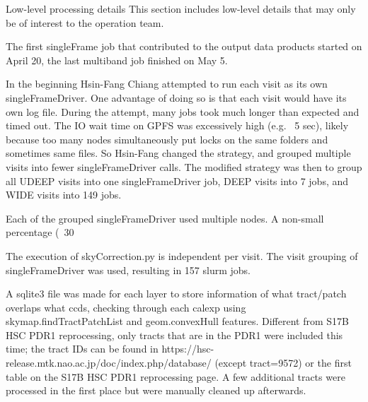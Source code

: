 Low-level processing details
This section includes low-level details that may only be of interest to the operation team.

The first singleFrame job that contributed to the output data products started on April 20, the last multiband job finished on May 5. 

In the beginning Hsin-Fang Chiang attempted to run each visit as its own singleFrameDriver. One advantage of doing so is that each visit would have its own log file. During the attempt, many jobs took much longer than expected and timed out. The IO wait time on GPFS was excessively high (e.g. ~5 sec), likely because too many nodes simultaneously put locks on the same folders and sometimes same files. So Hsin-Fang changed the strategy, and grouped multiple visits into fewer singleFrameDriver calls. The modified strategy was then to group all UDEEP visits into one singleFrameDriver job, DEEP visits into 7 jobs, and WIDE visits into 149 jobs. 

Each of the grouped singleFrameDriver used multiple nodes. A non-small percentage (~30%

The execution of skyCorrection.py is independent per visit. The visit grouping of singleFrameDriver was used, resulting in 157 slurm jobs. 

A sqlite3 file was made for each layer to store information of what tract/patch overlaps what ccds, checking through each calexp using skymap.findTractPatchList  and geom.convexHull features. Different from S17B HSC PDR1 reprocessing, only tracts that are in the PDR1 were included this time; the tract IDs can be found in https://hsc-release.mtk.nao.ac.jp/doc/index.php/database/ (except tract=9572) or the first table on the S17B HSC PDR1 reprocessing page.  A few additional tracts were processed in the first place but were manually cleaned up afterwards. 

